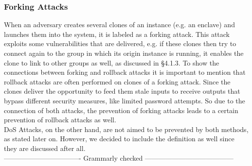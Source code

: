 \subsubsection{Forking Attacks}
When an adversary creates several clones of an instance (e.g. an enclave) and launches them into the system, it is labeled as a forking attack. This attack exploits some vulnerabilities that are delivered, e.g. if these clones then try to connect again to the group in which its origin instance is running, it enables the clone to link to other groups as well, as discussed in §4.1.3. 
To show the connections between forking and rollback attacks it is important to mention that rollback attacks are often performed on clones of a forking attack. Since the clones deliver the opportunity to feed them stale inputs to receive outputs that bypass different security measures, like limited password attempts. So due to the connection of both attacks, the prevention of forking attacks leads to a certain prevention of rollback attacks as well. \\

DoS Attacks, on the other hand, are not aimed to be prevented by both methods, as stated later on. However, we decided to include the definition as well since they are discussed after all. \\


---------------------------------- Grammarly checked ---------------------------------------



